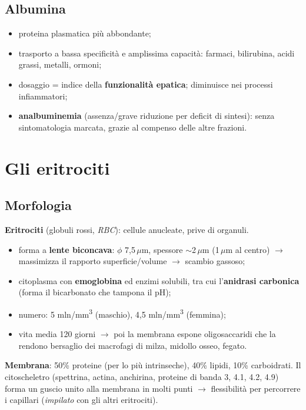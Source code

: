 \subsection{Albumina}
\begin{itemize}
  \item proteina plasmatica più abbondante;
  \item trasporto a bassa specificità e amplissima capacità: farmaci, bilirubina, acidi grassi,
    metalli, ormoni;
  \item dosaggio = indice della \textbf{funzionalità epatica}; diminuisce nei processi infiammatori;
  \item \textbf{analbuminemia} (assenza/grave riduzione per deficit di sintesi): senza
    sintomatologia marcata, grazie al compenso delle altre frazioni.
\end{itemize}

\section{Gli eritrociti}

\subsection{Morfologia}
\textbf{Eritrociti} (globuli rossi, \textit{RBC}): cellule anucleate, prive di organuli.
\begin{itemize}
  \item forma a \textbf{lente biconcava}: $\phi$ 7,5\,$\mu$m, spessore $\sim$2\,$\mu$m (1\,$\mu$m
    al centro) $\rightarrow$ massimizza il rapporto superficie/volume $\rightarrow$ scambio gassoso;
  \item citoplasma con \textbf{emoglobina} ed enzimi solubili, tra cui l'\textbf{anidrasi carbonica}
    (forma il bicarbonato che tampona il pH);
  \item numero: 5 mln/mm\textsuperscript{3} (maschio), 4,5 mln/mm\textsuperscript{3} (femmina);
  \item vita media 120 giorni $\rightarrow$ poi la membrana espone oligosaccaridi che la rendono
    bersaglio dei macrofagi di milza, midollo osseo, fegato.
\end{itemize}
\textbf{Membrana}: 50\% proteine (per lo più intrinseche), 40\% lipidi, 10\% carboidrati. Il
citoscheletro (spettrina, actina, anchirina, proteine di banda 3, 4.1, 4.2, 4.9) forma un guscio
unito alla membrana in molti punti $\rightarrow$ flessibilità per percorrere i capillari
(\textit{impilato} con gli altri eritrociti).

